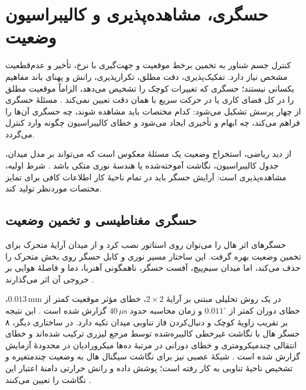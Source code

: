 \section{حسگری، مشاهده‌پذیری و کالیبراسیون وضعیت}
\label{sec:sensing-metrology-calibration}

کنترل جسم شناور به تخمین برخط موقعیت و جهت‌گیری با نرخ، تأخیر و عدم‌قطعیت مشخص نیاز دارد. تفکیک‌پذیری، دقت مطلق، تکرارپذیری، رانش و پهنای باند مفاهیم یکسانی نیستند؛ حسگری که تغییرات کوچک را تشخیص می‌دهد، الزاماً موقعیت مطلق را در کل فضای کاری یا در حرکت سریع با همان دقت تعیین نمی‌کند \cite{zhangLongrange6DOFAbsolute2024,huangLowcostHighefficiencyMagnetic2026}. مسئلهٔ حسگری از چهار پرسش تشکیل می‌شود: کدام مختصات باید مشاهده شوند، چه حسگری آن‌ها را فراهم می‌کند، چه ابهام و تأخیری ایجاد می‌شود و خطای کالیبراسیون چگونه وارد کنترل می‌گردد.

از دید ریاضی، استخراج وضعیت یک مسئلهٔ معکوس است که می‌تواند بر مدل میدان، جدول کالیبراسیون، نگاشت آموخته‌شده یا هندسهٔ نوری متکی باشد \cite{wangThreedimensionalElectromagneticAnalytical2025,yanPassiveMoverPose2025,sayedAutomaticDensityMeasurement2026}. شرط اولیه، مشاهده‌پذیری است: آرایش حسگر باید در تمام ناحیهٔ کار اطلاعات کافی برای تمایز مختصات موردنظر تولید کند.

\subsection{حسگری مغناطیسی و تخمین وضعیت}
\label{subsec:magnetic-pose-sensing}

حسگرهای اثر هال را می‌توان روی استاتور نصب کرد و از میدان آرایهٔ متحرک برای تخمین وضعیت بهره گرفت. این ساختار مسیر نوری و کابل حسگر روی بخش متحرک را حذف می‌کند، اما میدان سیم‌پیچ، آفست حسگر، ناهمگونی آهنربا، دما و فاصلهٔ هوایی بر خروجی آن اثر می‌گذارند \cite{ospanovaMagneticFieldSensing2025,huangLowcostHighefficiencyMagnetic2026}.

در یک روش تحلیلی مبتنی بر آرایهٔ $2\times2$، خطای مؤثر موقعیت کمتر از $0.013\,\mathrm{mm}$، خطای دوران کمتر از $0.011^\circ$ و زمان محاسبه حدود $40\,\mu\mathrm{s}$ گزارش شده است \cite{wangHallArrayBasedPositionPosture2026d}. این نتیجه بر تقریب زاویهٔ کوچک و دنبال‌کردن فاز تناوبی میدان تکیه دارد. در ساختاری دیگر، ۸ حسگر هال با نگاشت غیرخطی کالیبره‌شده توسط مرجع لیزری ترکیب شده‌اند و خطای انتقالی چندمیکرومتری و خطای دورانی در مرتبهٔ ده‌ها میکرورادیان در محدودهٔ آزمایش گزارش شده است \cite{huangLowcostHighefficiencyMagnetic2026}. شبکهٔ عصبی نیز برای نگاشت سیگنال هال به وضعیت چندمتغیره و تشخیص ناحیهٔ تناوبی به کار رفته است؛ پوشش داده و رانش حرارتی دامنهٔ اعتبار این نگاشت را تعیین می‌کنند \cite{yanPassiveMoverPose2025}.

